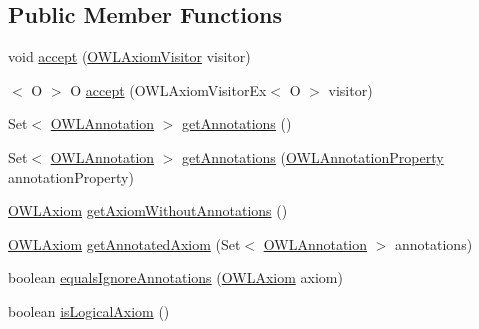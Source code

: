 \subsection*{Public Member Functions}
\begin{DoxyCompactItemize}
\item 
void \hyperlink{interfaceorg_1_1semanticweb_1_1owlapi_1_1model_1_1_o_w_l_axiom_ae7927a4371507c6be52fe935496336a1}{accept} (\hyperlink{interfaceorg_1_1semanticweb_1_1owlapi_1_1model_1_1_o_w_l_axiom_visitor}{O\-W\-L\-Axiom\-Visitor} visitor)
\item 
$<$ O $>$ O \hyperlink{interfaceorg_1_1semanticweb_1_1owlapi_1_1model_1_1_o_w_l_axiom_ab7b267e4011c9efb24c60f7dc64088e0}{accept} (O\-W\-L\-Axiom\-Visitor\-Ex$<$ O $>$ visitor)
\item 
Set$<$ \hyperlink{interfaceorg_1_1semanticweb_1_1owlapi_1_1model_1_1_o_w_l_annotation}{O\-W\-L\-Annotation} $>$ \hyperlink{interfaceorg_1_1semanticweb_1_1owlapi_1_1model_1_1_o_w_l_axiom_ad9c9394a0ffcfbebfc1ebab18121e8f2}{get\-Annotations} ()
\item 
Set$<$ \hyperlink{interfaceorg_1_1semanticweb_1_1owlapi_1_1model_1_1_o_w_l_annotation}{O\-W\-L\-Annotation} $>$ \hyperlink{interfaceorg_1_1semanticweb_1_1owlapi_1_1model_1_1_o_w_l_axiom_ac77a206dba45c23764e770055277305c}{get\-Annotations} (\hyperlink{interfaceorg_1_1semanticweb_1_1owlapi_1_1model_1_1_o_w_l_annotation_property}{O\-W\-L\-Annotation\-Property} annotation\-Property)
\item 
\hyperlink{interfaceorg_1_1semanticweb_1_1owlapi_1_1model_1_1_o_w_l_axiom}{O\-W\-L\-Axiom} \hyperlink{interfaceorg_1_1semanticweb_1_1owlapi_1_1model_1_1_o_w_l_axiom_a721c7ca0069fe8ff69947b9513498af3}{get\-Axiom\-Without\-Annotations} ()
\item 
\hyperlink{interfaceorg_1_1semanticweb_1_1owlapi_1_1model_1_1_o_w_l_axiom}{O\-W\-L\-Axiom} \hyperlink{interfaceorg_1_1semanticweb_1_1owlapi_1_1model_1_1_o_w_l_axiom_a85909dbec0a5ff86b0650d014601aef9}{get\-Annotated\-Axiom} (Set$<$ \hyperlink{interfaceorg_1_1semanticweb_1_1owlapi_1_1model_1_1_o_w_l_annotation}{O\-W\-L\-Annotation} $>$ annotations)
\item 
boolean \hyperlink{interfaceorg_1_1semanticweb_1_1owlapi_1_1model_1_1_o_w_l_axiom_aa761dfbfbc6af23e7d6264f46baada37}{equals\-Ignore\-Annotations} (\hyperlink{interfaceorg_1_1semanticweb_1_1owlapi_1_1model_1_1_o_w_l_axiom}{O\-W\-L\-Axiom} axiom)
\item 
boolean \hyperlink{interfaceorg_1_1semanticweb_1_1owlapi_1_1model_1_1_o_w_l_axiom_a418ae7ad8e90290ef5b05e13ec777054}{is\-Logical\-Axiom} ()

\end{DoxyCompactItemize}
